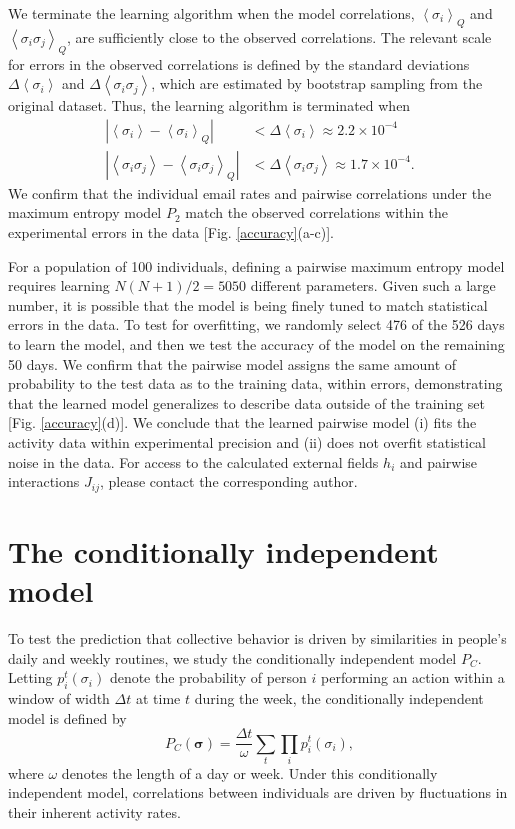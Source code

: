 \documentclass[aps,reprint,superscriptaddress,amsmath,amssymb,longbibliography]{revtex4-1}
\begin{document}
We terminate the learning algorithm when the model correlations, $\left<\sigma_i\right>_Q$ and $\left<\sigma_i\sigma_j\right>_Q$, are sufficiently close to the observed correlations. The relevant scale for errors in the observed correlations is defined by the standard deviations $\Delta\left<\sigma_i\right>$ and $\Delta\left<\sigma_i\sigma_j\right>$, which are estimated by bootstrap sampling from the original dataset. Thus, the learning algorithm is terminated when 
\begin{align}
|\left<\sigma_i\right> - \left<\sigma_i\right>_Q| &< \Delta\left<\sigma_i\right> \approx 2.2\times 10^{-4} \\
|\left<\sigma_i\sigma_j\right> - \left<\sigma_i\sigma_j\right>_Q| &< \Delta\left<\sigma_i\sigma_j\right> \approx 1.7\times 10^{-4}.
\end{align}
We confirm that the individual email rates and pairwise correlations under the maximum entropy model $P_2$ match the observed correlations within the experimental errors in the data [Fig. \ref{accuracy}(a-c)].

For a population of 100 individuals, defining a pairwise maximum entropy model requires learning $N(N+1)/2=5050$ different parameters. Given such a large number, it is possible that the model is being finely tuned to match statistical errors in the data. To test for overfitting, we randomly select 476 of the 526 days to learn the model, and then we test the accuracy of the model on the remaining 50 days. We confirm that the pairwise model assigns the same amount of probability to the test data as to the training data, within errors, demonstrating that the learned model generalizes to describe data outside of the training set [Fig. \ref{accuracy}(d)]. We conclude that the learned pairwise model (i) fits the activity data within experimental precision and (ii) does not overfit statistical noise in the data. For access to the calculated external fields $h_i$ and pairwise interactions $J_{ij}$, please contact the corresponding author.

\section{The conditionally independent model}

\label{CondInd}

To test the prediction that collective behavior is driven by similarities in people's daily and weekly routines, we study the conditionally independent model $P_C$. Letting $p_i^t(\sigma_i)$ denote the probability of person $i$ performing an action within a window of width $\Delta t$ at time $t$ during the week, the conditionally independent model is defined by
\begin{equation}
P_C(\bm{\sigma}) = \frac{\Delta t}{\omega}\sum_t \prod_i p_i^t(\sigma_i),
\end{equation}
where $\omega$ denotes the length of a day or week. Under this conditionally independent model, correlations between individuals are driven by fluctuations in their inherent activity rates.
\end{document}
